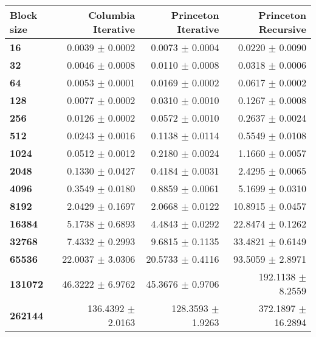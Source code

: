 \begin{tabular}{lrrr}\toprule
\textbf{Block size}  & \textbf{Columbia Iterative} & \textbf{Princeton Iterative} & \textbf{Princeton Recursive} \\\midrule
\textbf{16}     & 0.0039 $\pm$ 0.0002 & 0.0073 $\pm$ 0.0004 & 0.0220 $\pm$ 0.0090        \\
\textbf{32}     & 0.0046 $\pm$ 0.0008 & 0.0110 $\pm$ 0.0008 & 0.0318 $\pm$ 0.0006        \\
\textbf{64}     & 0.0053 $\pm$ 0.0001 & 0.0169 $\pm$ 0.0002 & 0.0617 $\pm$ 0.0002        \\
\textbf{128}    & 0.0077 $\pm$ 0.0002 & 0.0310 $\pm$ 0.0010 & 0.1267 $\pm$ 0.0008        \\
\textbf{256}    & 0.0126 $\pm$ 0.0002 & 0.0572 $\pm$ 0.0010 & 0.2637 $\pm$ 0.0024        \\
\textbf{512}    & 0.0243 $\pm$ 0.0016 & 0.1138 $\pm$ 0.0114 & 0.5549 $\pm$ 0.0108        \\
\textbf{1024}   & 0.0512 $\pm$ 0.0012 & 0.2180 $\pm$ 0.0024 & 1.1660 $\pm$ 0.0057        \\
\textbf{2048}   & 0.1330 $\pm$ 0.0427 & 0.4184 $\pm$ 0.0031 & 2.4295 $\pm$ 0.0065        \\
\textbf{4096}   & 0.3549 $\pm$ 0.0180 & 0.8859 $\pm$ 0.0061 & 5.1699 $\pm$ 0.0310        \\
\textbf{8192}   & 2.0429 $\pm$ 0.1697 & 2.0668 $\pm$ 0.0122 & 10.8915 $\pm$ 0.0457       \\
\textbf{16384}  & 5.1738 $\pm$ 0.6893 & 4.4843 $\pm$ 0.0292 & 22.8474 $\pm$ 0.1262       \\
\textbf{32768}  & 7.4332 $\pm$ 0.2993 & 9.6815 $\pm$ 0.1135 & 33.4821 $\pm$ 0.6149       \\
\textbf{65536}  & 22.0037 $\pm$ 3.0306 & 20.5733 $\pm$ 0.4116 & 93.5059 $\pm$ 2.8971     \\
\textbf{131072} & 46.3222 $\pm$ 6.9762 & 45.3676 $\pm$ 0.9706 & 192.1138 $\pm$ 8.2559    \\
\textbf{262144} & 136.4392 $\pm$ 2.0163 & 128.3593 $\pm$ 1.9263 & 372.1897 $\pm$ 16.2894 \\
\bottomrule
\end{tabular}
